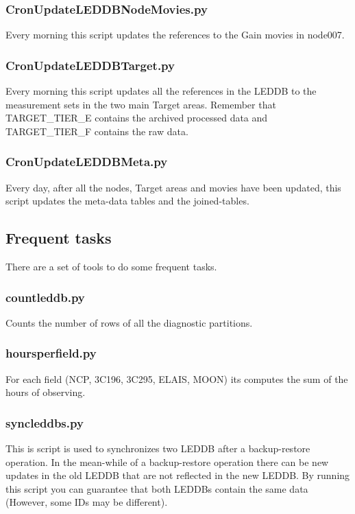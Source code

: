\documentclass[a4paper,11pt]{article}
\begin{document}
\subsubsection*{CronUpdateLEDDBNodeMovies.py}

Every morning this script updates the references to the Gain movies in node007.

\subsubsection*{CronUpdateLEDDBTarget.py}

Every morning this script updates all the references in the LEDDB to the measurement sets in the two main Target areas. Remember that TARGET\_TIER\_E contains the archived processed data and TARGET\_TIER\_F contains the raw data. 

\subsubsection*{CronUpdateLEDDBMeta.py}

Every day, after all the nodes, Target areas and movies have been updated, this script updates the meta-data tables and the joined-tables.

\subsection{Frequent tasks}

There are a set of tools to do some frequent tasks.

\subsubsection*{countleddb.py}

Counts the number of rows of all the diagnostic partitions.

\subsubsection*{hoursperfield.py}

For each field (NCP, 3C196, 3C295, ELAIS, MOON) its computes the sum of the hours of observing.

\subsubsection*{syncleddbs.py}

This is script is used to synchronizes two LEDDB after a backup-restore operation. In the mean-while of a backup-restore operation there can be new updates in the old LEDDB that are not reflected in the new LEDDB. By running this script you can guarantee that both LEDDBs contain the same data (However, some IDs may be different).
\end{document}
